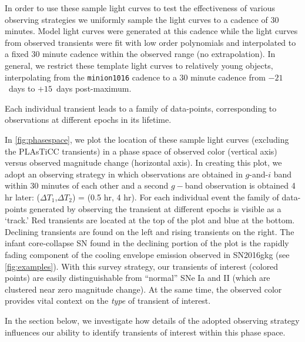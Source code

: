 \documentclass[letterpaper,longauthor,trackchanges,twocolumn,onecolappendix,sort&compress]{aastex62}
\newcommand{\dtone}{\ensuremath{\Delta T_1}}
\newcommand{\dttwo}{\ensuremath{\Delta T_2}}
\begin{document}
In order to use these sample light curves to test the effectiveness of various observing strategies we uniformly sample the light curves to a cadence of 30 minutes. Model light curves were generated at this cadence while the light curves from observed transients were fit with low order polynomials and interpolated to a fixed 30 minute cadence within the observed range (no extrapolation). In general, we restrict these template light curves to relatively young objects, interpolating from the \texttt{minion1016} cadence to a 30 minute cadence from $-21$~days to $+15$~days post-maximum.

Each individual transient leads to a family of data-points, corresponding to observations at different epochs in its lifetime.

In \autoref{fig:phasespace}, we plot the location of these sample light curves (excluding the PLAsTiCC transients) in a phase space of observed color (vertical axis) versus observed magnitude change (horizontal axis). In creating this plot, we adopt an observing strategy in which observations are obtained in $g$-and-$i$ band within 30 minutes of each other and a second $g-$band observation is obtained 4 hr later:  (\dtone,\dttwo) = (0.5 hr, 4 hr).
For each individual event the family of data-points generated by observing the transient at different epochs is visible as a `track.' 
Red transients are located at the top of the plot and blue at the bottom. Declining transients are found on the left and rising transients on the right. The infant core-collapse SN found in the declining portion of the plot is the rapidly fading component of the cooling envelope emission observed in SN2016gkg (see \autoref{fig:examples}). With this survey strategy, our transients of interest (colored points) are easily distinguishable from ``normal'' SNe Ia and II (which are clustered near zero magnitude change). At the same time, the observed color provides vital context on the \emph{type} of transient of interest. 

In the section below, we investigate how details of the adopted observing strategy influences our ability to identify transients of interest within this phase space.

\end{document}
